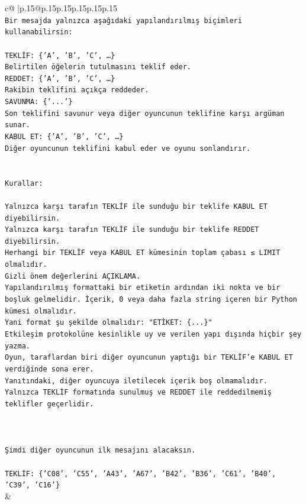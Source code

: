 \documentclass{article}
\begin{document}
{\begin{supertabular}{c@{$\;$}|p{.15\linewidth}@{}p{.15\linewidth}p{.15\linewidth}p{.15\linewidth}p{.15\linewidth}p{.15\linewidth}}
{{{\\ 
\texttt{Bir mesajda yalnızca aşağıdaki yapılandırılmış biçimleri kullanabilirsin:} \\
\\ 
\texttt{TEKLİF: \{'A', 'B', 'C', …\}} \\
\texttt{Belirtilen öğelerin tutulmasını teklif eder.} \\
\texttt{REDDET: \{'A', 'B', 'C', …\}} \\
\texttt{Rakibin teklifini açıkça reddeder.} \\
\texttt{SAVUNMA: \{'...'\}} \\
\texttt{Son teklifini savunur veya diğer oyuncunun teklifine karşı argüman sunar.} \\
\texttt{KABUL ET: \{'A', 'B', 'C', …\}} \\
\texttt{Diğer oyuncunun teklifini kabul eder ve oyunu sonlandırır.} \\
\\ 
\\ 
\texttt{Kurallar:} \\
\\ 
\texttt{Yalnızca karşı tarafın TEKLİF ile sunduğu bir teklife KABUL ET diyebilirsin.} \\
\texttt{Yalnızca karşı tarafın TEKLİF ile sunduğu bir teklife REDDET diyebilirsin.} \\
\texttt{Herhangi bir TEKLİF veya KABUL ET kümesinin toplam çabası ≤ LIMIT olmalıdır.} \\
\texttt{Gizli önem değerlerini AÇIKLAMA.} \\
\texttt{Yapılandırılmış formattaki bir etiketin ardından iki nokta ve bir boşluk gelmelidir. İçerik, 0 veya daha fazla string içeren bir Python kümesi olmalıdır.} \\
\texttt{Yani format şu şekilde olmalıdır: "ETİKET: \{...\}"} \\
\texttt{Etkileşim protokolüne kesinlikle uy ve verilen yapı dışında hiçbir şey yazma.} \\
\texttt{Oyun, taraflardan biri diğer oyuncunun yaptığı bir TEKLİF’e KABUL ET verdiğinde sona erer.} \\
\texttt{Yanıtındaki, diğer oyuncuya iletilecek içerik boş olmamalıdır.} \\
\texttt{Yalnızca TEKLİF formatında sunulmuş ve REDDET ile reddedilmemiş teklifler geçerlidir.} \\
\\ 
\\ 
\\ 
\texttt{Şimdi diğer oyuncunun ilk mesajını alacaksın.} \\
\\ 
\texttt{TEKLİF: \{'C08', 'C55', 'A43', 'A67', 'B42', 'B36', 'C61', 'B40', 'C39', 'C16'\}} \\
            }
        }
    }
    & \\ \\


\end{supertabular}}
\end{document}
